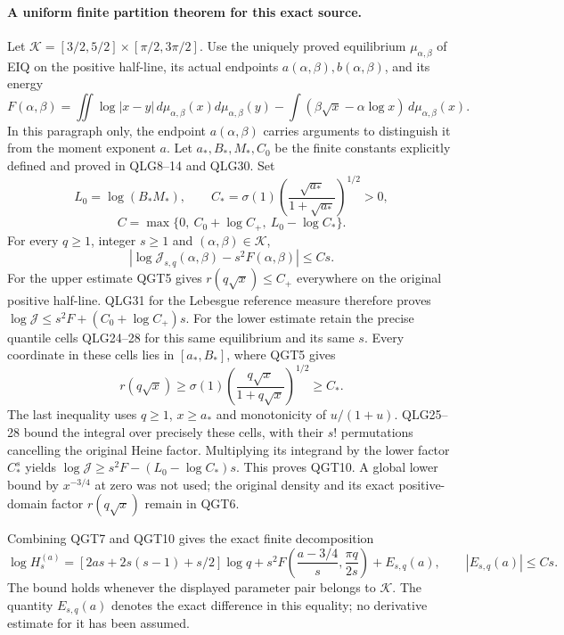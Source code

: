 \paragraph{A uniform finite partition theorem for this exact source.}
Let $\mathcal K=[3/2,5/2]\times[\pi/2,3\pi/2]$. Use the uniquely
proved equilibrium $\mu_{\alpha,\beta}$ of EIQ on the positive
half-line, its actual endpoints $a(\alpha,\beta),b(\alpha,\beta)$,
and its energy
\[
 F(\alpha,\beta)=\iint\log|x-y|\,d\mu_{\alpha,\beta}(x)
                    d\mu_{\alpha,\beta}(y)
       -\int(\beta\sqrt x-\alpha\log x)\,d\mu_{\alpha,\beta}(x).
 \tag{QGT8}
\]
In this paragraph only, the endpoint $a(\alpha,\beta)$ carries
arguments to distinguish it from the moment exponent $a$.
Let $a_*,B_*,M_*,C_0$ be the finite constants explicitly defined and
proved in QLG8--14 and QLG30. Set
\[
 L_0=\log(B_*M_*),\qquad
 C_* =\sigma(1)
          \left(\frac{\sqrt{a_*}}{1+\sqrt{a_*}}\right)^{1/2}>0,
\]
\[
 C=\max\{0,\ C_0+\log C_+,\ L_0-\log C_*\}.
 \tag{QGT9}
\]
For every $q\ge1$, integer $s\ge1$ and $(\alpha,\beta)\in\mathcal K$,
\[
 \boxed{\left|\log\mathcal J_{s,q}(\alpha,\beta)
                         -s^2F(\alpha,\beta)\right|\le Cs.}
 \tag{QGT10}
\]
For the upper estimate QGT5 gives $r(q\sqrt x)\le C_+$ everywhere
on the original positive half-line. QLG31 for the Lebesgue reference
measure therefore proves
$\log\mathcal J\le s^2F+(C_0+\log C_+)s$.
For the lower estimate retain the precise quantile cells QLG24--28
for this same equilibrium and its same $s$. Every coordinate in
these cells lies in $[a_*,B_*]$, where QGT5 gives
\[
 r(q\sqrt x)\ge\sigma(1)
      \left(\frac{q\sqrt x}{1+q\sqrt x}\right)^{1/2}\ge C_*.
\]
The last inequality uses $q\ge1$, $x\ge a_*$ and monotonicity of
$u/(1+u)$. QLG25--28 bound the integral over precisely these cells,
with their $s!$ permutations cancelling the original Heine factor.
Multiplying its integrand by the lower factor $C_*^s$ yields
$\log\mathcal J\ge s^2F-(L_0-\log C_*)s$.
This proves QGT10. A global lower bound by $x^{-3/4}$ at zero was
not used; the original density and its exact positive-domain factor
$r(q\sqrt x)$ remain in QGT6.

Combining QGT7 and QGT10 gives the exact finite decomposition
\[
 \boxed{\log H_s^{(a)}=
 [2as+2s(s-1)+s/2]\log q
 +s^2F\left(\frac{a-3/4}{s},\frac{\pi q}{2s}\right)+E_{s,q}(a),
 \qquad |E_{s,q}(a)|\le Cs.}
 \tag{QGT11}
\]
The bound holds whenever the displayed parameter pair belongs to
$\mathcal K$. The quantity $E_{s,q}(a)$ denotes the exact difference
in this equality; no derivative estimate for it has been assumed.

